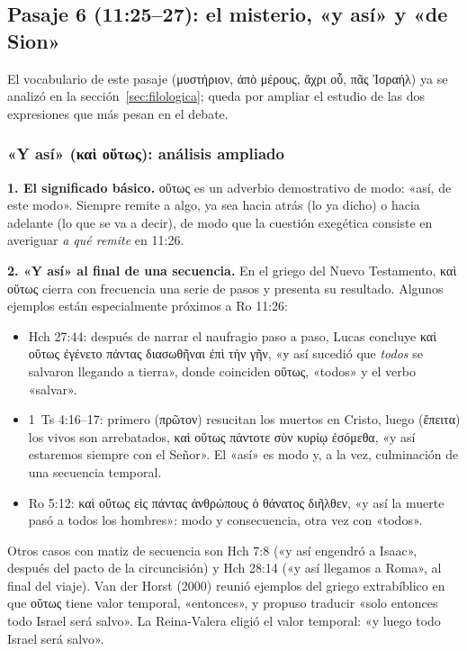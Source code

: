 \documentclass[11pt,letterpaper]{article}
\newcommand{\grc}[1]{\foreignlanguage{ancientgreek}{#1}}
\begin{document}
\subsection{Pasaje 6 (11:25--27): el misterio, «y así» y «de Sion»}

El vocabulario de este pasaje (\grc{μυστήριον}, \grc{ἀπὸ μέρους}, \grc{ἄχρι οὗ}, \grc{πᾶς Ἰσραήλ}) ya se analizó en la sección~\ref{sec:filologica}; queda por ampliar el estudio de las dos expresiones que más pesan en el debate.

\subsubsection*{«Y así» (\grc{καὶ οὕτως}): análisis ampliado}

\textbf{1. El significado básico.} \grc{οὕτως} es un adverbio demostrativo de modo: «así, de este modo». Siempre remite a algo, ya sea hacia atrás (lo ya dicho) o hacia adelante (lo que se va a decir), de modo que la cuestión exegética consiste en averiguar \emph{a qué remite} en 11:26.

\textbf{2. «Y así» al final de una secuencia.} En el griego del Nuevo Testamento, \grc{καὶ οὕτως} cierra con frecuencia una serie de pasos y presenta su resultado. Algunos ejemplos están especialmente próximos a Ro 11:26:
\begin{itemize}
\item Hch 27:44: después de narrar el naufragio paso a paso, Lucas concluye \grc{καὶ οὕτως ἐγένετο πάντας διασωθῆναι ἐπὶ τὴν γῆν}, «y así sucedió que \emph{todos} se salvaron llegando a tierra», donde coinciden \grc{οὕτως}, «todos» y el verbo «salvar».
\item 1~Ts 4:16--17: primero (\grc{πρῶτον}) resucitan los muertos en Cristo, luego (\grc{ἔπειτα}) los vivos son arrebatados, \grc{καὶ οὕτως πάντοτε σὺν κυρίῳ ἐσόμεθα}, «y así estaremos siempre con el Señor». El «así» es modo y, a la vez, culminación de una secuencia temporal.
\item Ro 5:12: \grc{καὶ οὕτως εἰς πάντας ἀνθρώπους ὁ θάνατος διῆλθεν}, «y así la muerte pasó a todos los hombres»: modo y consecuencia, otra vez con «todos».
\end{itemize}
Otros casos con matiz de secuencia son Hch 7:8 («y así engendró a Isaac», después del pacto de la circuncisión) y Hch 28:14 («y así llegamos a Roma», al final del viaje). Van der Horst (2000) reunió ejemplos del griego extrabíblico en que \grc{οὕτως} tiene valor temporal, «entonces», y propuso traducir «solo entonces todo Israel será salvo». La Reina-Valera eligió el valor temporal: «y luego todo Israel será salvo».
\end{document}
